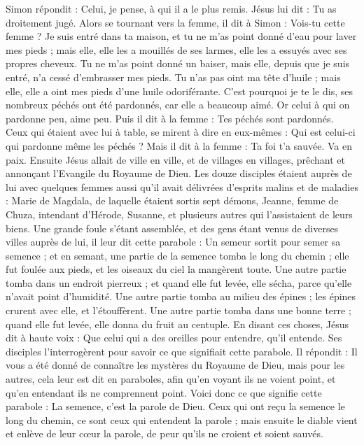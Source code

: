 \begin{multicols}{2}
Simon répondit : Celui, je pense, à qui il a le plus remis. Jésus lui dit : Tu as droitement jugé.
Alors se tournant vers la femme, il dit à Simon : Vois-tu cette femme ? Je suis entré dans ta maison, et tu ne m'as point donné d'eau pour laver mes pieds ; mais elle, elle les a mouillés de ses larmes, elle les a essuyés avec ses propres cheveux.
Tu ne m'as point donné un baiser, mais elle, depuis que je suis entré, n'a cessé d’embrasser mes pieds.
Tu n'as pas oint ma tête d'huile ; mais elle, elle a oint mes pieds d'une huile odoriférante.
C'est pourquoi je te le dis, ses nombreux péchés ont été pardonnés, car elle a beaucoup aimé. Or celui à qui on pardonne peu, aime peu.
Puis il dit à la femme : Tes péchés sont pardonnés.
Ceux qui étaient avec lui à table, se mirent à dire en eux-mêmes : Qui est celui-ci qui pardonne même les péchés ?
Mais il dit à la femme : Ta foi t'a sauvée. Va en paix.
\VerseOne{}Ensuite Jésus allait de ville en ville, et de villages en villages, prêchant et annonçant l’Evangile du Royaume de Dieu.
Les douze disciples étaient auprès de lui avec quelques femmes aussi qu'il avait délivrées d’esprits malins et de maladies : Marie de Magdala, de laquelle étaient sortis sept démons,
Jeanne, femme de Chuza, intendant d'Hérode, Susanne, et plusieurs autres qui l'assistaient de leurs biens.
Une grande foule s’étant assemblée, et des gens étant venus de diverses villes auprès de lui, il leur dit cette parabole :
Un semeur sortit pour semer sa semence ; et en semant, une partie de la semence tomba le long du chemin ; elle fut foulée aux pieds, et les oiseaux du ciel la mangèrent toute.
Une autre partie tomba dans un endroit pierreux ; et quand elle fut levée, elle sécha, parce qu'elle n'avait point d'humidité.
Une autre partie tomba au milieu des épines ; les épines crurent avec elle, et l'étouffèrent.
Une autre partie tomba dans une bonne terre ; quand elle fut levée, elle donna du fruit au centuple. En disant ces choses, Jésus dit à haute voix : Que celui qui a des oreilles pour entendre, qu'il entende.
Ses disciples l'interrogèrent pour savoir ce que signifiait cette parabole.
Il répondit : Il vous a été donné de connaître les mystères du Royaume de Dieu, mais pour les autres, cela leur est dit en paraboles, afin qu'en voyant ils ne voient point, et qu'en entendant ils ne comprennent point.
Voici donc ce que signifie cette parabole : La semence, c'est la parole de Dieu.
Ceux qui ont reçu la semence le long du chemin, ce sont ceux qui entendent la parole ; mais ensuite le diable vient et enlève de leur cœur la parole, de peur qu’ils ne croient et soient sauvés.

\end{multicols}
